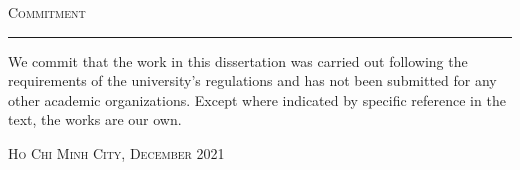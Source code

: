 \thispagestyle{empty}
\vspace*{3cm}
\noindent\Huge\textsc{Commitment}\\
\normalsize
\noindent\rule[2pt]{\textwidth}{0.8pt}
\hspace*{5cm}


We commit that the work in this dissertation was carried out following the requirements of the university’s regulations and has not been submitted for any other academic organizations. Except where indicated by specific reference in the text, the works are our own.
	
	\hfill \textsc{Ho Chi Minh City, December 2021}
	
\cleardoublepage
